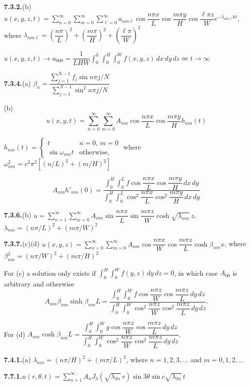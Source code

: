 \medskip
\textbf{7.3.2.}\quad (b) $u(x,y,z,t) = \sum_{n=0}^{\infty}\sum_{m=0}^{\infty}\sum_{\ell=0}^{\infty} a_{nm\ell}\cos\dfrac{n\pi x}{L}\cos\dfrac{m\pi y}{H}\cos\dfrac{\ell\pi z}{W}e^{-\lambda_{nm\ell}kt}$,
where $\lambda_{nm\ell} = \left(\dfrac{n\pi}{L}\right)^2+\left(\dfrac{m\pi}{H}\right)^2+\left(\dfrac{\ell\pi}{W}\right)^2$

$u(x,y,z,t) \to a_{000} = \dfrac{1}{LHW}\int_0^L\int_0^H\int_0^W f(x,y,z)\,dx\,dy\,dz$ as $t \to \infty$

\medskip
\textbf{7.3.4.}\quad (a) $\beta_n = \dfrac{\sum_{j=1}^{N-1}f_j\sin n\pi j/N}{\sum_{j=1}^{N-1}\sin^2 n\pi j/N}$

\quad (b)
\[
u(x,y,t) = \sum_{n=0}^{\infty}\sum_{m=0}^{\infty} A_{nm}\cos\dfrac{n\pi x}{L}\cos\dfrac{m\pi y}{H}h_{nm}(t)
\]

$h_{nm}(t) = \begin{cases} t & n=0,\,m=0 \\ \sin\omega_{nm}t & \text{otherwise,}\end{cases}$ where $\omega_{nm}^2 = c^2\pi^2\left[(n/L)^2+(m/H)^2\right]$

\[
A_{nm}h'_{nm}(0) = \dfrac{\int_0^H\int_0^L f\cos\dfrac{n\pi x}{L}\cos\dfrac{m\pi y}{H}\,dx\,dy}{\int_0^H\int_0^L\cos^2\dfrac{n\pi x}{L}\cos^2\dfrac{m\pi y}{H}\,dx\,dy}
\]

\medskip
\textbf{7.3.6.}\quad (b) $u = \sum_{n=1}^{\infty}\sum_{m=0}^{\infty} A_{nm}\sin\dfrac{n\pi x}{L}\sin\dfrac{m\pi z}{W}\cosh\sqrt{\lambda_{nm}}\,z$,
$\lambda_{nm} = (n\pi/L)^2+(m\pi/W)^2$

\medskip
\textbf{7.3.7.}\quad (c)(d) $u(x,y,z) = \sum_{n=0}^{\infty}\sum_{m=0}^{\infty} A_{nm}\cos\dfrac{n\pi x}{W}\cos\dfrac{m\pi z}{L}\cosh\beta_{nm}x$,
where $\beta_{nm}^2 = (n\pi/W)^2+(m\pi/H)^2$

For (c) a solution only exists if $\int_0^H\int_0^W f(y,z)\,dy\,dz = 0$,
in which case $A_{00}$ is arbitrary and otherwise
\[
A_{nm}\beta_{nm}\sinh\beta_{nm}L = \dfrac{\int_0^H\int_0^W f\cos\dfrac{n\pi z}{W}\cos\dfrac{m\pi z}{L}\,dy\,dz}{\int_0^H\int_0^W\cos^2\dfrac{n\pi z}{W}\cos^2\dfrac{m\pi z}{L}\,dy\,dz}.
\]

For (d) $A_{nm}\cosh\beta_{nm}L = \dfrac{\int_0^H\int_0^W g\cos\dfrac{n\pi z}{W}\cos\dfrac{m\pi z}{L}\,dy\,dz}{\int_0^H\int_0^W\cos^2\dfrac{n\pi z}{W}\cos^2\dfrac{m\pi z}{L}\,dy\,dz}$.

\medskip
\textbf{7.4.1.}\quad (a) $\lambda_{nm} = (n\pi/H)^2+(m\pi/L)^2$, where $n=1,2,3,\ldots$ and $m=0,1,2,\ldots$

\medskip
\textbf{7.7.1.}\quad $u(r,\theta,t) = \sum_{n=1}^{\infty}A_n J_3(\sqrt{\lambda_{3n}}\,r)\sin 3\theta\sin c\sqrt{\lambda_{3n}}\,t$

